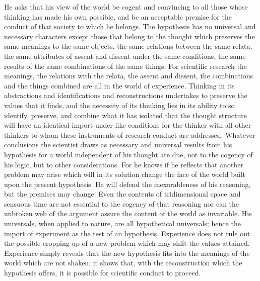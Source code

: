 \documentclass[12pt]{article}
\begin{document}
He asks that his view of the world be cogent and
convincing to all those whose thinking has made his
own possible, and be an acceptable premise for the
conduct of that society to which he belongs. The
hypothesis has no universal and necessary characters
except those that belong to the thought which preserves
the same meanings to the same objects, the same relations
between the same relata, the same attributes of
assent and dissent under the same conditions, the same
results of the same combinations of the same things.
For scientific research the meanings, the relations with
the relata, the assent and dissent, the combinations
and the things combined are all in the world of experience.
Thinking in its abstractions and identifications
and reconstructions undertakes to preserve the values
that it finds, and the necessity of its thinking lies in its
ability to so identify, preserve, and combine what it
has isolated that the thought structure will have an
identical import under like conditions for the thinker
with all other thinkers to whom these instruments of
research conduct are addressed. Whatever conclusions
the scientist draws as necessary and universal results
from his hypothesis for a world independent of his
thought are due, not to the cogency of his logic, but
to other considerations. For he knows if he reflects
that another problem may arise which will in its solution
change the face of the world built upon the present
hypothesis. He will defend the inexorableness of his
reasoning, but the premises may change. Even the
contents of tridimensional space and sensuous time are
not essential to the cogency of that reasoning nor can
the unbroken web of the argument assure the content
of the world as invariable. His universals, when applied
to nature, are all hypothetical universals; hence
the import of experiment as the test of an hypothesis.
Experience does not rule out the possible cropping up of
a new problem which may shift the values attained.
Experience simply reveals that the new hypothesis fits
into the meanings of the world which are not shaken;
it shows that, with the reconstruction which the hypothesis
offers, it is possible for scientific conduct to
proceed.
\end{document}
